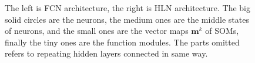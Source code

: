 \documentclass[3p,times,procedia]{elsarticle}
\begin{document}
\begin{figure}
	\centering
	\hspace{0.2in}
	\caption{The left is FCN architecture, 
	the right is HLN architecture.
	The big solid circles are the 
	neurons, the medium ones are the 
	middle states of neurons, and 
	the small ones are the vector maps 
	$\mathbf{m}^k$ of SOMs, finally the 
	tiny ones are the function modules.
	The parts omitted refers to repeating
	hidden layers connected in same way.}
	\label{fig:1}
\end{figure}
\end{document}
